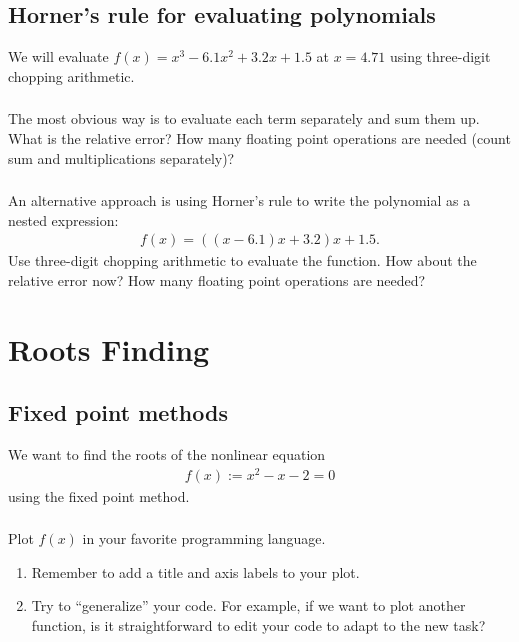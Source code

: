\documentclass[11pt,letterpaper]{report}
\begin{document}
\section{Horner's rule for evaluating polynomials}
We will evaluate $f(x) = x^3-6.1x^2+3.2x+1.5$ at $x=4.71$ using three-digit chopping arithmetic. 

\subsection{}
The most obvious way is to evaluate each term separately and sum them up. What is the relative error? How many floating point operations are needed (count sum and multiplications separately)?

\subsection{}
An alternative approach is using Horner's rule to write the polynomial as a nested expression:
\begin{align*}
    f(x) = ((x-6.1)x+3.2)x+1.5.
\end{align*}
Use three-digit chopping arithmetic to evaluate the function. How about the relative error now? How many floating point operations are needed?
\chapter{Roots Finding}
\section{Fixed point methods}
We want to find the roots of the nonlinear equation
\begin{align*}
    f(x) := x^2-x-2 = 0
\end{align*}
using the fixed point method.

\subsection{}
Plot $f(x)$ in your favorite programming language. 
\begin{enumerate}
    \item Remember to add a title and axis labels to your plot.
    \item Try to ``generalize'' your code. For example, if we want to plot another function, is it straightforward to edit your code to adapt to the new task?
\end{enumerate}
\end{document}
